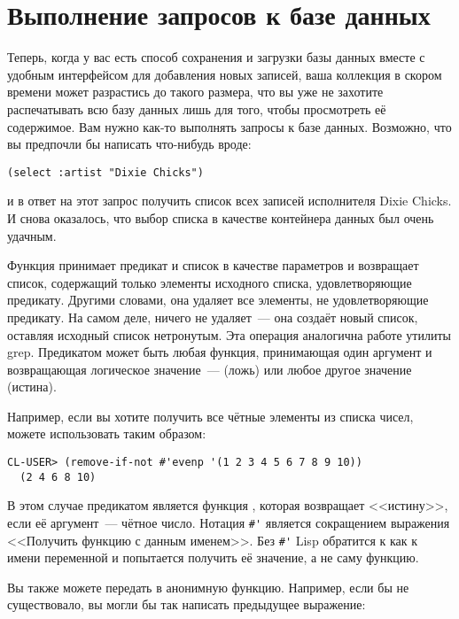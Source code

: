 \section{Выполнение запросов к базе данных}

Теперь, когда у вас есть способ сохранения и загрузки базы данных вместе с удобным
интерфейсом для добавления новых записей, ваша коллекция в скором времени может разрастись
до такого размера, что вы уже не захотите распечатывать всю базу данных лишь для того,
чтобы просмотреть её содержимое. Вам нужно как-то выполнять запросы к базе
данных. Возможно, что вы предпочли бы написать что-нибудь вроде:

\begin{lstlisting}[style=lisprepl]
  (select :artist "Dixie Chicks")
\end{lstlisting}

и в ответ на этот запрос получить список всех записей исполнителя Dixie Chicks. И снова
оказалось, что выбор списка в качестве контейнера данных был очень удачным.

Функция  принимает предикат и список в качестве параметров и
возвращает список, содержащий только элементы исходного списка, удовлетворяющие
предикату. Другими словами, она удаляет все элементы, не удовлетворяющие предикату. На
самом деле,  ничего не удаляет~--- она создаёт новый список, оставляя
исходный список нетронутым. Эта операция аналогична работе утилиты grep. Предикатом может
быть любая функция, принимающая один аргумент и возвращающая логическое значение~---
 (ложь) или любое другое значение (истина).

Например, если вы хотите получить все чётные элементы из списка чисел, можете использовать
 таким образом:

\begin{lstlisting}[style=lisprepl]
  CL-USER> (remove-if-not #'evenp '(1 2 3 4 5 6 7 8 9 10))
  (2 4 6 8 10)
\end{lstlisting}

В этом случае предикатом является функция , которая возвращает <<истину>>,
если её аргумент~--- чётное число. Нотация \lstinline!#'! является сокращением выражения
<<Получить функцию с данным именем>>. Без \lstinline!#'! Lisp обратится к  как к
имени переменной и попытается получить её значение, а не саму функцию.

Вы также можете передать в  анонимную функцию. Например, если бы
 не существовало, вы могли бы так написать предыдущее выражение:

